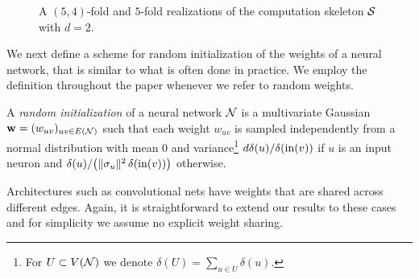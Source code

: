 \begin{figure}[t]
\caption{A $(5,4)$-fold and $5$-fold realizations of the computation
skeleton ${\cal S}$ with $d=2$.\label{fig:ct_to_nn}}
\end{figure}

We next define a scheme for random initialization of the weights of a neural
network, that is similar to what is often done in practice. We employ the definition throughout the paper whenever we refer to
random weights.
%
\begin{definition}\label{def:rand_weights}
%
A {\em random initialization} of a neural network ${\cal N}$ is a
multivariate Gaussian ${\mathbf w}=(w_{uv})_{uv\in E({\cal N})}$ such that each weight
$w_{uv}$ is sampled independently from a normal distribution with mean $0$
and variance\footnote{For $U\subset V({\cal N})$ we denote $\delta(U) = \sum_{u\in U}\delta(u)$.} ${d\delta(u)}/{\delta(\mathrm{in}(v))}$ if $u$ is an input neuron and ${\delta(u)}/{\left(\|\sigma_{u}\|^2\,\delta(\mathrm{in}(v))\right)}$ otherwise.
%
\end{definition}
%
\noindent
Architectures such as convolutional nets have weights that are shared
across different edges.
Again, it is straightforward to extend our results to these cases and for
simplicity we assume no explicit weight sharing.

